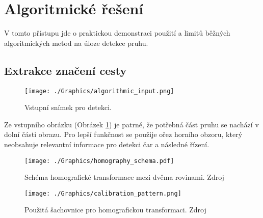 \documentclass[czech, bc, kky, he, iso690numb]{fasthesis}
\begin{document}
        	
        \section{Algoritmické řešení}
        	V tomto přístupu jde o praktickou demonstraci použití a limitů běžných algoritmických metod na úloze detekce pruhu.
            \subsection{Extrakce značení cesty}
            
	            	\begin{figure}[h]
	            		\centering
	            		\texttt{[image: ./Graphics/algorithmic\_input.png]}
	            		\caption{Vstupní snímek pro detekci.}
	            		\label{pic:algorithmic_input}
	            	\end{figure}
	            	
            	Ze vstupního obrázku (Obrázek \ref{pic:algorithmic_input}) je patrné, že potřebná část pruhu se nachází v dolní části obrazu. Pro lepší funkčnost se použije ořez horního obzoru, který neobsahuje relevantní informace pro detekci čar a následné řízení.
            	
            		\begin{figure}[h]
            			\centering
            			\texttt{[image: ./Graphics/homography\_schema.pdf]}
            			\caption{Schéma homografické transformace mezi dvěma rovinami. Zdroj \cite[p.~385]{learning_opencv}}
            			\label{pic:homography_schema}
            		\end{figure}
            		
            		\begin{figure}[h]
            			\centering
            			\texttt{[image: ./Graphics/calibration\_pattern.png]}
            			\caption{Použitá šachovnice pro homografickou transformaci. Zdroj \cite{duckietown_documentation}}
            			\label{pic:calibration_pattern}
            		\end{figure}
            	
\end{document}
